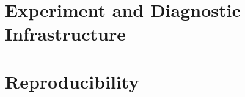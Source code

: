 \section{Experiment and Diagnostic Infrastructure}\label{sec:impl-probes}

%

\section{Reproducibility}\label{sec:impl-reproducibility}

